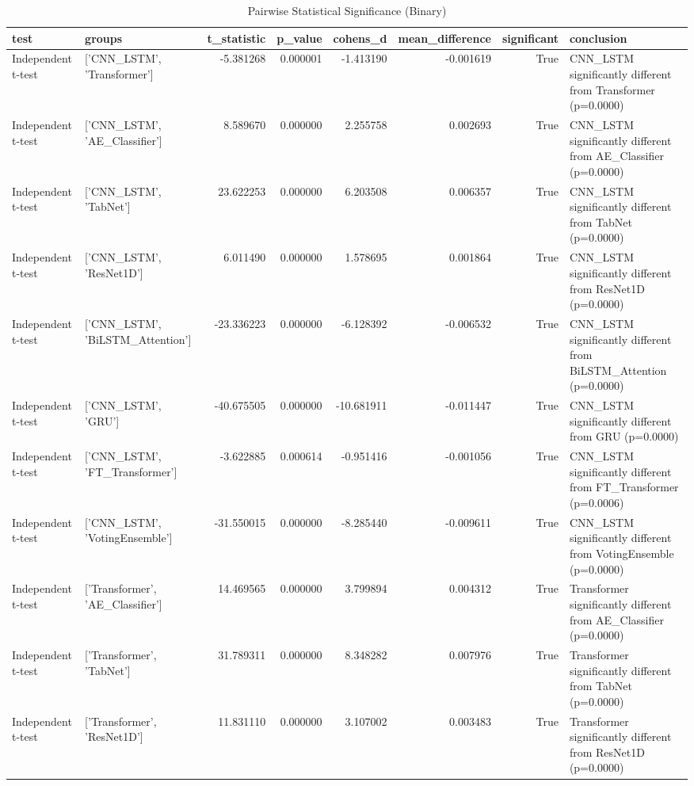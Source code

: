 \begin{table}
\caption{Pairwise Statistical Significance (Binary)}
\label{tab:stat_tests_binary}
\begin{tabular}{llrrrrrl}
\toprule
test & groups & t_statistic & p_value & cohens_d & mean_difference & significant & conclusion \\
\midrule
Independent t-test & ['CNN_LSTM', 'Transformer'] & -5.381268 & 0.000001 & -1.413190 & -0.001619 & True & CNN_LSTM significantly different from Transformer (p=0.0000) \\
Independent t-test & ['CNN_LSTM', 'AE_Classifier'] & 8.589670 & 0.000000 & 2.255758 & 0.002693 & True & CNN_LSTM significantly different from AE_Classifier (p=0.0000) \\
Independent t-test & ['CNN_LSTM', 'TabNet'] & 23.622253 & 0.000000 & 6.203508 & 0.006357 & True & CNN_LSTM significantly different from TabNet (p=0.0000) \\
Independent t-test & ['CNN_LSTM', 'ResNet1D'] & 6.011490 & 0.000000 & 1.578695 & 0.001864 & True & CNN_LSTM significantly different from ResNet1D (p=0.0000) \\
Independent t-test & ['CNN_LSTM', 'BiLSTM_Attention'] & -23.336223 & 0.000000 & -6.128392 & -0.006532 & True & CNN_LSTM significantly different from BiLSTM_Attention (p=0.0000) \\
Independent t-test & ['CNN_LSTM', 'GRU'] & -40.675505 & 0.000000 & -10.681911 & -0.011447 & True & CNN_LSTM significantly different from GRU (p=0.0000) \\
Independent t-test & ['CNN_LSTM', 'FT_Transformer'] & -3.622885 & 0.000614 & -0.951416 & -0.001056 & True & CNN_LSTM significantly different from FT_Transformer (p=0.0006) \\
Independent t-test & ['CNN_LSTM', 'VotingEnsemble'] & -31.550015 & 0.000000 & -8.285440 & -0.009611 & True & CNN_LSTM significantly different from VotingEnsemble (p=0.0000) \\
Independent t-test & ['Transformer', 'AE_Classifier'] & 14.469565 & 0.000000 & 3.799894 & 0.004312 & True & Transformer significantly different from AE_Classifier (p=0.0000) \\
Independent t-test & ['Transformer', 'TabNet'] & 31.789311 & 0.000000 & 8.348282 & 0.007976 & True & Transformer significantly different from TabNet (p=0.0000) \\
Independent t-test & ['Transformer', 'ResNet1D'] & 11.831110 & 0.000000 & 3.107002 & 0.003483 & True & Transformer significantly different from ResNet1D (p=0.0000) \\

\end{tabular}
\end{table}
